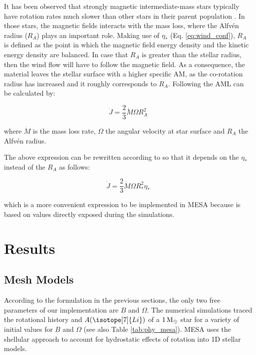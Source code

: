 \documentclass[fleqn,usenatbib]{mnras}
\begin{document}
It has been observed that strongly magnetic intermediate-mass stars typically have rotation rates much slower than other stars in their parent population \citep{Mathys2006}. In those stars, the magnetic fields interacts with the mass loss, where the Alfv\'{e}n radius ($R_{A}$) plays an important role. Making use of $\eta_*$ (Eq. \ref{eq:wind_conf}), $R_{A}$ is defined as the point in which the magnetic field energy density and the kinetic energy density are balanced. In case that $R_{A}$ is greater than the stellar radius, then the wind flow will have to follow the magnetic field. As a consequence, the material leaves the stellar surface with a higher specific AM, as the co-rotation radius has increased and it roughly corresponds to $R_{A}$. Following \citet{Weber1967} the AML can be calculated by:
\begin{ceqn}
\begin{equation}
 \Dot{J} = \frac{2}{3} \Dot{M}\Omega R^{2}_{A} \label{eq:j_dot}
\end{equation}
\end{ceqn}
where $\Dot{M}$ is the mass loss rate, $\Omega$ the angular velocity at star surface and $R_A$ the Alfv\'{e}n radius. \par

The above expression can be rewritten according to \citet{Ud-Doula2008} so that it depends on the $\eta_*$ instead of the $R_A$ as follows:
\begin{ceqn}
\begin{equation}
 \Dot{J} = \frac{2}{3} \Dot{M}\Omega R^{2}_{*}\eta_* \label{eq:j_dot_mesa}
\end{equation}
\end{ceqn}
which is a more convenient expression to be implemented in MESA because is based on values directly exposed during the simulations.

\section{Results} \label{sec_3}

\subsection{Mesh Models} \label{sec_mesh}
According to the formulation in the previous sections, the only two free parameters of our implementation are $B$ and $\Omega$. The numerical simulations traced the rotational history and $A(\isotope[7]{Li})$ of a $1\, \mathrm{M}_\odot$ star for a variety of initial values for $B$ and $\Omega$ (see also Table \ref{tab:phy_mesa}). MESA uses the shellular approach \citep{Meynet1997} to account for hydrostatic effects of rotation into 1D stellar models.\par
\end{document}

